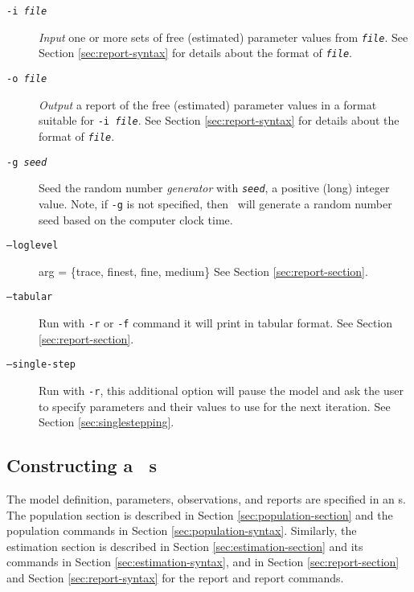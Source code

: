 \begin{description}
\item [\texttt{-i \emph{file}}] \emph{Input} one or more sets of free (estimated) parameter values from \texttt{\emph{file}}. See Section \ref{sec:report-syntax} for details about the format of \texttt{\emph{file}}.

\item [\texttt{-o \emph{file}}] \emph{Output} a report of the free (estimated) parameter values in a format suitable for \texttt{-i \emph{file}}. See Section \ref{sec:report-syntax} for details about the format of \texttt{\emph{file}}.

\item [\texttt{-g \emph{seed}}]  Seed the random number \emph{generator} with \texttt{\emph{seed}}, a positive (long) integer value. Note, if \texttt{-g} is not specified, then \CNAME\ will  generate a random number seed based on the computer clock time.

\item [\texttt{--loglevel}] arg = \{trace, finest, fine, medium\} See Section \ref{sec:report-section}.

\item [\texttt{--tabular}] Run with \texttt{-r} or \texttt{-f}  command it will print  in tabular format. See Section \ref{sec:report-section}.

\item [\texttt{--single-step}] Run with \texttt{-r}, this additional option will pause the model and ask the user to specify parameters and their values to use for the next iteration. See Section \ref{sec:singlestepping}.
\end{description}

\subsection{Constructing a \CNAME\ \config s \label{constructing-config}}

The model definition, parameters, observations, and reports are specified in an \config s. The  population section is described in Section \ref{sec:population-section} and the population commands in Section \ref{sec:population-syntax}. Similarly, the estimation section is described in Section \ref{sec:estimation-section} and its commands in Section \ref{sec:estimation-syntax}, and in Section \ref{sec:report-section} and Section \ref{sec:report-syntax} for the report and report commands. 


